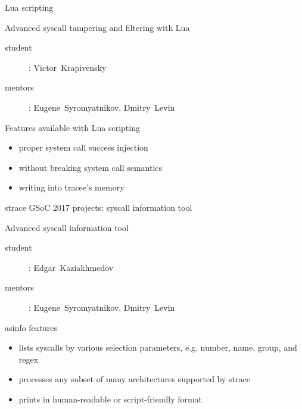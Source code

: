 \documentclass[unicode,aspectratio=169]{beamer}
\begin{document}
\begin{frame}[fragile]{Lua scripting}
\begin{block}{\large Advanced syscall tampering and filtering with Lua}
\begin{description}
\item[student]: Victor~Krapivensky
\item[mentors]: Eugene~Syromyatnikov, Dmitry~Levin
\end{description}
\end{block}
\begin{block}{Features available with Lua scripting}
\begin{itemize}
\item proper system call success injection
\item without breaking system call semantics
\item writing into tracee's memory
\end{itemize}
\end{block}
\end{frame}


\begin{frame}{strace GSoC 2017 projects: syscall information tool}
\begin{block}{\large Advanced syscall information tool}
\begin{description}
\item[student]: Edgar~Kaziakhmedov
\item[mentors]: Eugene~Syromyatnikov, Dmitry~Levin
\end{description}
\end{block}
\begin{block}{asinfo features}
\begin{itemize}
\item lists syscalls by various selection parameters,
e.g. number, name, group, and regex
\item processes any subset of many architectures supported by strace
\item prints in human-readable or script-friendly format
\end{itemize}
\end{block}
\end{frame}
\end{document}
